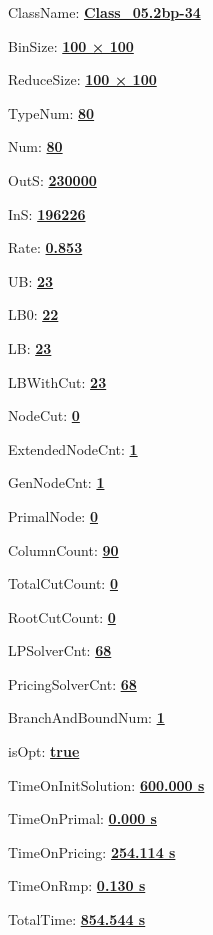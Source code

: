 \documentclass[11pt]{article}
\begin{document}
\pagestyle{empty}


ClassName: \underline{\textbf{Class_05.2bp-34}}
\par
BinSize: \underline{\textbf{100 × 100}}
\par
ReduceSize: \underline{\textbf{100 × 100}}
\par
TypeNum: \underline{\textbf{80}}
\par
Num: \underline{\textbf{80}}
\par
OutS: \underline{\textbf{230000}}
\par
InS: \underline{\textbf{196226}}
\par
Rate: \underline{\textbf{0.853}}
\par
UB: \underline{\textbf{23}}
\par
LB0: \underline{\textbf{22}}
\par
LB: \underline{\textbf{23}}
\par
LBWithCut: \underline{\textbf{23}}
\par
NodeCut: \underline{\textbf{0}}
\par
ExtendedNodeCnt: \underline{\textbf{1}}
\par
GenNodeCnt: \underline{\textbf{1}}
\par
PrimalNode: \underline{\textbf{0}}
\par
ColumnCount: \underline{\textbf{90}}
\par
TotalCutCount: \underline{\textbf{0}}
\par
RootCutCount: \underline{\textbf{0}}
\par
LPSolverCnt: \underline{\textbf{68}}
\par
PricingSolverCnt: \underline{\textbf{68}}
\par
BranchAndBoundNum: \underline{\textbf{1}}
\par
isOpt: \underline{\textbf{true}}
\par
TimeOnInitSolution: \underline{\textbf{600.000 s}}
\par
TimeOnPrimal: \underline{\textbf{0.000 s}}
\par
TimeOnPricing: \underline{\textbf{254.114 s}}
\par
TimeOnRmp: \underline{\textbf{0.130 s}}
\par
TotalTime: \underline{\textbf{854.544 s}}
\par
\newpage


\end{document}

